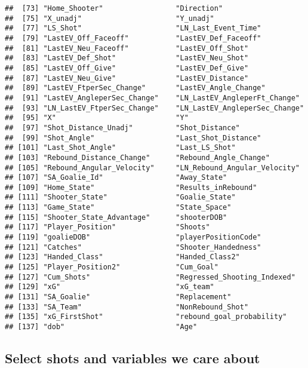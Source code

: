 \documentclass[]{article}
\begin{document}
\begin{verbatim}
##  [73] "Home_Shooter"                 "Direction"                   
##  [75] "X_unadj"                      "Y_unadj"                     
##  [77] "LS_Shot"                      "LN_Last_Event_Time"          
##  [79] "LastEV_Off_Faceoff"           "LastEV_Def_Faceoff"          
##  [81] "LastEV_Neu_Faceoff"           "LastEV_Off_Shot"             
##  [83] "LastEV_Def_Shot"              "LastEV_Neu_Shot"             
##  [85] "LastEV_Off_Give"              "LastEV_Def_Give"             
##  [87] "LastEV_Neu_Give"              "LastEV_Distance"             
##  [89] "LastEV_FtperSec_Change"       "LastEV_Angle_Change"         
##  [91] "LastEV_AngleperSec_Change"    "LN_LastEV_AngleperFt_Change" 
##  [93] "LN_LastEV_FtperSec_Change"    "LN_LastEV_AngleperSec_Change"
##  [95] "X"                            "Y"                           
##  [97] "Shot_Distance_Unadj"          "Shot_Distance"               
##  [99] "Shot_Angle"                   "Last_Shot_Distance"          
## [101] "Last_Shot_Angle"              "Last_LS_Shot"                
## [103] "Rebound_Distance_Change"      "Rebound_Angle_Change"        
## [105] "Rebound_Angular_Velocity"     "LN_Rebound_Angular_Velocity" 
## [107] "SA_Goalie_Id"                 "Away_State"                  
## [109] "Home_State"                   "Results_inRebound"           
## [111] "Shooter_State"                "Goalie_State"                
## [113] "Game_State"                   "State_Space"                 
## [115] "Shooter_State_Advantage"      "shooterDOB"                  
## [117] "Player_Position"              "Shoots"                      
## [119] "goalieDOB"                    "playerPositionCode"          
## [121] "Catches"                      "Shooter_Handedness"          
## [123] "Handed_Class"                 "Handed_Class2"               
## [125] "Player_Position2"             "Cum_Goal"                    
## [127] "Cum_Shots"                    "Regressed_Shooting_Indexed"  
## [129] "xG"                           "xG_team"                     
## [131] "SA_Goalie"                    "Replacement"                 
## [133] "SA_Team"                      "NonRebound_Shot"             
## [135] "xG_FirstShot"                 "rebound_goal_probability"    
## [137] "dob"                          "Age"
\end{verbatim}

\subsection{Select shots and variables we care
about}\label{select-shots-and-variables-we-care-about}
\end{document}
